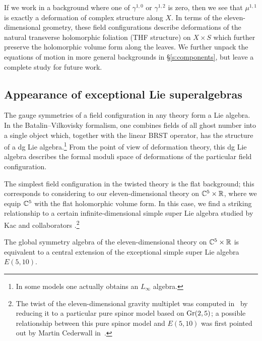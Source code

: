If we work in a background where one of $\gamma^{1,0}$ or $\gamma^{1,2}$ is zero, then we see that $\mu^{1,1}$ is exactly a deformation of complex structure along $X$. 
In terms of the eleven-dimensional geometry, these field configurations describe deformations of the natural transverse holomorphic foliation (THF structure) on $X \times S$ which further preserve the holomorphic volume form along the leaves.
We further unpack the equations of motion in more general backgrounds in \S \ref{s:components}, but leave a complete study for future work.


\subsection*{Appearance of exceptional Lie superalgebras}

The gauge symmetries of a field configuration in any theory form a Lie algebra. 
In the Batalin--Vilkovisky formalism, one combines fields of all ghost number into a single object which, together with the linear BRST operator, has the structure of a dg Lie algebra.\footnote{In some models one actually obtains an $L_\infty$ algebra.} 
From the point of view of deformation theory, this dg Lie algebra describes the formal moduli space of deformations of the particular field configuration. 

The simplest field configuration in the twisted theory is the flat background; this corresponds to considering to our eleven-dimensional theory on $\mathbb C^5 \times \mathbb R$, where we equip $\mathbb C^5$ with the flat holomorphic volume form. 
In this case, we find a striking relationship to a certain infinite-dimensional simple super Lie algebra studied by Kac and collaborators \cite{KacBible,KacE510}.\footnote{The twist of the eleven-dimensional gravity multiplet was computed in~\cite{SWspinor} by reducing it to a particular pure spinor model based on ${\rm Gr}(2,5)$; a possible relationship between this pure spinor model and $E(5,10)$ was first pointed out by Martin Cederwall in~\cite{martinSL5}.}

\begin{thm}
The global symmetry algebra of the eleven-dimensional theory on $\mathbb C^5 \times \mathbb R$ is equivalent to a central extension of the exceptional simple super Lie algebra $E(5,10)$. 
\end{thm}

